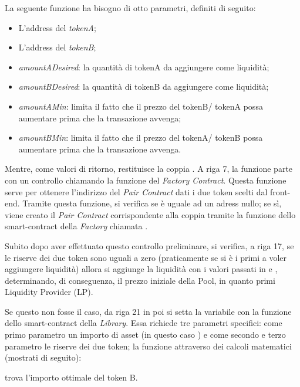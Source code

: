 La seguente funzione ha bisogno di otto parametri, definiti di seguito:
\begin{itemize}
\item L'address del \textit{tokenA};
\item L'address del \textit{tokenB};
\item \textit{amountADesired}: la quantità di tokenA da aggiungere come liquidità;
\item \textit{amountBDesired}: la quantità di tokenB da aggiungere come liquidità;
\item \textit{amountAMin}: limita il fatto che il prezzo del tokenB/ tokenA possa aumentare prima che la transazione avvenga;
\item \textit{amountBMin}: limita il fatto che il prezzo del tokenA/ tokenB possa aumentare prima che la transazione avvenga.
\end{itemize}
Mentre, come valori di ritorno, restituisce la coppia .
A riga 7, la funzione parte con un controllo chiamando la funzione  del \textit{Factory Contract}. Questa funzione serve per ottenere l'indirizzo del \textit{Pair Contract} dati i due token scelti dal front-end. Tramite questa funzione, si verifica se è uguale ad un adress nullo; se sì, viene creato il \textit{Pair Contract} corrispondente alla coppia tramite la funzione dello smart-contract della \textit{Factory} chiamata  .

Subito dopo aver effettuato questo controllo preliminare, si verifica, a riga 17, se le riserve dei due token sono uguali a zero (praticamente se si è i primi a voler aggiungere liquidità) allora si aggiunge la liquidità con i valori passati in   e , determinando, di conseguenza, il prezzo iniziale della Pool, in quanto primi Liquidity Provider (LP).

Se questo non fosse il caso, da riga 21 in poi si setta la variabile  con la funzione  dello smart-contract della \textit{Library}. Essa richiede tre parametri specifici: come primo parametro un importo di asset (in questo caso  ) e come secondo e terzo parametro le riserve dei due token; la funzione attraverso dei calcoli matematici (mostrati di seguito):
\begin{quote}
\centering
\end{quote}
trova l'importo ottimale del token B.

